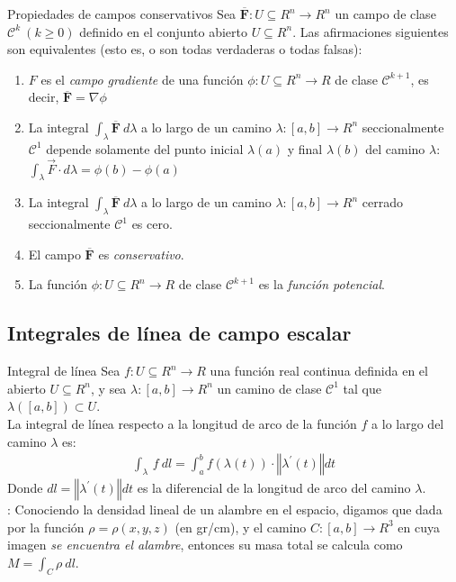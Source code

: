 \documentclass[a4paper, twoside]{article}
\numberwithin{equation}{section}
\numberwithin{figure}{section}
\numberwithin{table}{section}
\newcommand{\vect}[1]{\overline{\textbf{#1}}}
\begin{document}
\begin{corolario*}{Propiedades de campos conservativos}
	Sea $\vect{F}: U \subseteq R^n \to R^n$ un campo de clase $\mathcal{C}^{k}\:(k\ge0)$ definido en el conjunto abierto $U\subseteq R^n$. Las afirmaciones siguientes son equivalentes (esto es, o son todas verdaderas o todas falsas):
	\begin{enumerate}
		\item $F$ es el \emph{campo gradiente} de una función $\phi:U \subseteq R^n \to R$ de clase $\mathcal{C}^{k+1}$, es decir, $\vect{F}=\nabla\phi$
		\item La integral $\int_{\lambda} \vect{F}\: d\lambda$ a lo largo de un camino $\lambda: [a,b] \to R^n$ seccionalmente $\mathcal{C}^1$ depende solamente del punto inicial $\lambda(a)$ y final $\lambda(b)$ del camino $\lambda$: $\int_{\lambda} \vec{F} \cdot d\lambda=\phi(b)-\phi(a)$
		\item La integral $\int_{\lambda}\vect{F}\: d\lambda$ a lo largo de un camino $\lambda:[a,b] \to R^n$ cerrado seccionalmente $\mathcal{C}^1$ es cero.
		\item El campo $\vect{F}$ es \textit{conservativo}.
		\item La función $\phi: U \subseteq R^n \to R$ de clase $\mathcal{C}^{k+1}$ es la \textit{función potencial}.
	\end{enumerate}
\end{corolario*}

\subsection{Integrales de línea de campo escalar}
\begin{definicion*}{Integral de línea}
	Sea $f: U \subseteq R^n \to R$ una función real continua definida en el abierto $U \subseteq R^n$, y sea $\lambda:[a,b] \to R^n$ un camino de clase $\mathcal{C}^1$ tal que $\lambda\left([a,b]\right)\subset U$.\\

	La integral de línea respecto a la longitud de arco de la función $f$ a lo largo del camino $\lambda$ es:
	\begin{align}
		\int_{\lambda}\, f\: dl=\int_{a}^{b}f\left(\lambda(t)\right) \cdot \left\Vert \lambda^\prime(t) \right\Vert dt
	\end{align}
	Donde $dl=\left\Vert \lambda^\prime(t) \right\Vert dt$ es la diferencial de la longitud de arco del camino $\lambda$.\\

	: Conociendo la densidad lineal de un alambre en el espacio, digamos que dada por la función $\rho=\rho(x,y,z)$ (en gr/cm), y el camino $C:[a,b] \to R^3$ en cuya imagen \emph{se encuentra el alambre}, entonces su masa total se calcula como $M=\int_{C} \rho\: dl$.
\end{definicion*}
\end{document}
